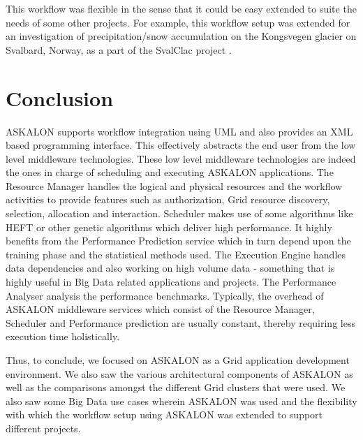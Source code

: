 \documentclass[9pt,twocolumn,twoside]{../../styles/osajnl}
\begin{document}
This workflow was flexible in the sense that it could be easy extended
to suite the needs of some other projects.  For example, this workflow
setup was extended for an investigation of precipitation/snow
accumulation on the Kongsvegen glacier on Svalbard, Norway, as a part
of the SvalClac project \cite{ASKALON-Big-data-project}.

\section{Conclusion}

ASKALON supports workflow integration using UML and also provides an
XML based programming interface.  This effectively abstracts the end
user from the low level middleware technologies.  These low level
middleware technologies are indeed the ones in charge of scheduling
and executing ASKALON applications.  The Resource Manager handles the
logical and physical resources and the workflow activities to provide
features such as authorization, Grid resource discovery, selection,
allocation and interaction.  Scheduler makes use of some algorithms
like HEFT or other genetic algorithms which deliver high performance.
It highly benefits from the Performance Prediction service which in
turn depend upon the training phase and the statistical methods used.
The Execution Engine handles data dependencies and also working on
high volume data - something that is highly useful in Big Data related
applications and projects.  The Performance Analyser analysis the
performance benchmarks.  Typically, the overhead of ASKALON middleware
services which consist of the Resource Manager, Scheduler and
Performance prediction are usually constant, thereby requiring less
execution time holistically.

Thus, to conclude, we focused on ASKALON as a Grid application
development environment.  We also saw the various architectural
components of ASKALON as well as the comparisons amongst the different
Grid clusters that were used.  We also saw some Big Data use cases
wherein ASKALON was used and the flexibility with which the workflow
setup using ASKALON was extended to support different projects.



\end{document}
